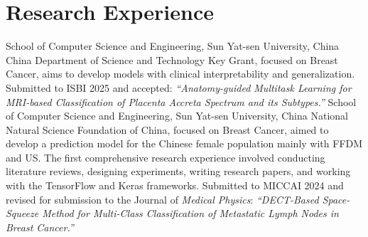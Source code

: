 \documentclass[11pt,a4paper, final]{moderncv}
\begin{document}
\section{\textbf{Research Experience}}%
	{}{}{School of Computer Science and Engineering, Sun Yat-sen University, China}
	{China Department of Science and Technology Key Grant, focused on Breast Cancer, 
	aims to develop models with clinical interpretability and generalization.}
	{Submitted to ISBI 2025 and accepted: 
	\emph{``Anatomy-guided Multitask Learning for MRI-based Classification of Placenta Accreta Spectrum and its Subtypes.''}}
	{}{}{School of Computer Science and Engineering, Sun Yat-sen University, China}
	{National Natural Science Foundation of China, focused on Breast Cancer, 
	aimed to develop a prediction model for the Chinese female population mainly with FFDM and US.}
	{The first comprehensive research experience involved conducting literature reviews, designing experiments, 
	writing research papers, and working with the TensorFlow and Keras frameworks.}
	{Submitted to MICCAI 2024 and revised for submission to the Journal of \emph{Medical Physics}: 
	\emph{``DECT-Based Space-Squeeze Method for Multi-Class Classification of Metastatic Lymph Nodes in Breast Cancer.''}}
\end{document}
